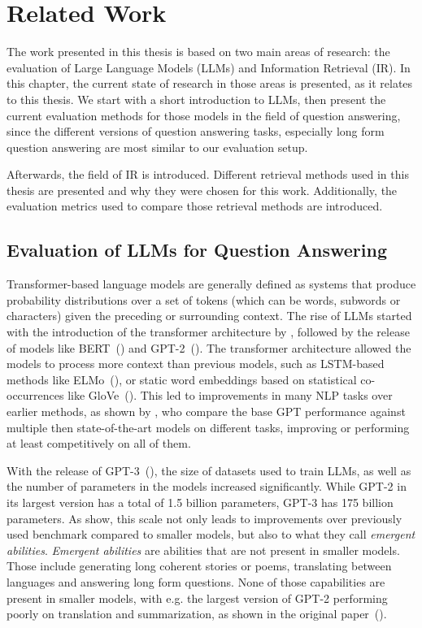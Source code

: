 \chapter{Related Work}\label{related-work}
The work presented in this thesis is based on two main areas of research: the evaluation of Large Language Models (LLMs) and Information Retrieval (IR).
In this chapter, the current state of research in those areas is presented, as it relates to this thesis.
We start with a short introduction to LLMs, then present the current evaluation methods for those models in the field of question answering, since the different versions of question answering tasks, especially long form question answering are most similar to our evaluation setup.

Afterwards, the field of IR is introduced.
Different retrieval methods used in this thesis are presented and why they were chosen for this work.
Additionally, the evaluation metrics used to compare those retrieval methods are introduced.

\section{Evaluation of LLMs for Question Answering}\label{sec:evaluation-of-large-language-models}
Transformer-based language models are generally defined as systems that produce probability distributions over a set of tokens (which can be words, subwords or characters) given the preceding or surrounding context.    
The rise of LLMs started with the introduction of the transformer architecture by \cite{vaswani:2017:Attention}, followed by the release of models like BERT~(\cite{devlin:2018:BERT}) and GPT-2~(\cite{radford:2018:Improving}).
The transformer architecture allowed the models to process more context than previous models, such as LSTM-based methods like ELMo~(\cite{peters:2018:Deep}), or static word embeddings based on statistical co-occurrences like GloVe~(\cite{pennington:2014:Glove}).
This led to improvements in many NLP tasks over earlier methods, as shown by \cite{radford:2018:Improving}, who compare the base GPT performance against multiple then state-of-the-art models on different tasks, improving or performing at least competitively on all of them.

With the release of GPT-3~(\cite{brown:2020:Language}), the size of datasets used to train LLMs, as well as the number of parameters in the models increased significantly.
While GPT-2 in its largest version has a total of 1.5 billion parameters, GPT-3 has 175 billion parameters.
As \cite{wei:2022:Emergent} show, this scale not only leads to improvements over previously used benchmark compared to smaller models, but also to what they call \textit{emergent abilities}.
\textit{Emergent abilities} are abilities that are not present in smaller models.
Those include generating long coherent stories or poems, translating between languages and answering long form questions.
None of those capabilities are present in smaller models, with e.g. the largest version of GPT-2 performing poorly on translation and summarization, as shown in the original paper~(\cite{radford:2018:Improving}).

